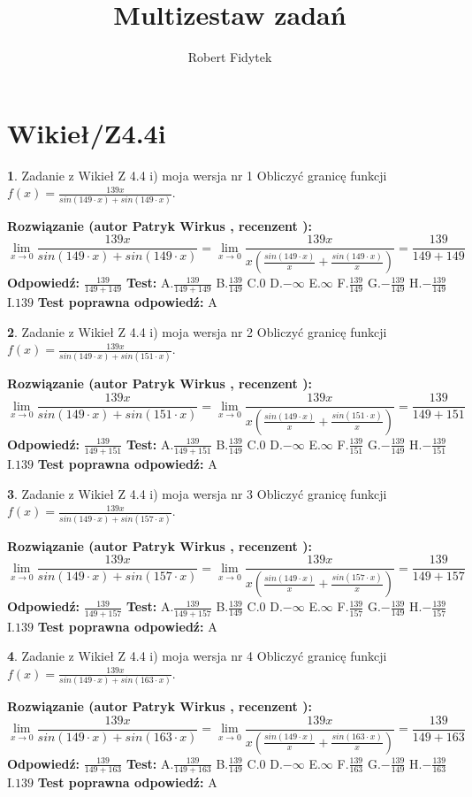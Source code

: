 \documentclass[12pt, a4paper]{article}
\title{Multizestaw zadań}
\author{Robert Fidytek}
\date{}
\theoremstyle{definition} %
\newtheorem{zad}{}
\newcommand{\kategoria}[1]{\section{#1}}
\newcommand{\zadStart}[1]{\begin{zad}#1\newline}
\newcommand{\zadStop}{\end{zad}}
\newcommand{\rozwStart}[2]{\noindent \textbf{Rozwiązanie (autor #1 , recenzent #2): }\newline}
\newcommand{\rozwStop}{\newline}
\newcommand{\odpStart}{\noindent \textbf{Odpowiedź:}\newline}
\newcommand{\odpStop}{\newline}
\newcommand{\testStart}{\noindent \textbf{Test:}\newline}
\newcommand{\testStop}{\newline}
\newcommand{\kluczStart}{\noindent \textbf{Test poprawna odpowiedź:}\newline}
\newcommand{\kluczStop}{\newline}
\begin{document}
\maketitle

\kategoria{Wikieł/Z4.4i}


\zadStart{Zadanie z Wikieł Z 4.4 i) moja wersja nr 1}
Obliczyć granicę funkcji $f(x)=\frac{139x}{sin(149\cdot x) +sin(149\cdot x)}$.
\zadStop
\rozwStart{Patryk Wirkus}{}
$$\lim\limits_{x\to 0}\frac{139x}{sin(149\cdot x) +sin(149\cdot x)}=\lim\limits_{x\to 0}\frac{139x}{x(\frac{sin(149\cdot x)}{x}+\frac{sin(149\cdot x)}{x})}=\frac{139}{149+149}$$
\rozwStop
\odpStart
$\frac{139}{149+149}$
\odpStop
\testStart
A.$\frac{139}{149+149}$
B.$\frac{139}{149}$
C.$0$
D.$-\infty$
E.$\infty$
F.$\frac{139}{149}$
G.$-\frac{139}{149}$
H.$-\frac{139}{149}$
I.$139$
\testStop
\kluczStart
A
\kluczStop



\zadStart{Zadanie z Wikieł Z 4.4 i) moja wersja nr 2}
Obliczyć granicę funkcji $f(x)=\frac{139x}{sin(149\cdot x) +sin(151\cdot x)}$.
\zadStop
\rozwStart{Patryk Wirkus}{}
$$\lim\limits_{x\to 0}\frac{139x}{sin(149\cdot x) +sin(151\cdot x)}=\lim\limits_{x\to 0}\frac{139x}{x(\frac{sin(149\cdot x)}{x}+\frac{sin(151\cdot x)}{x})}=\frac{139}{149+151}$$
\rozwStop
\odpStart
$\frac{139}{149+151}$
\odpStop
\testStart
A.$\frac{139}{149+151}$
B.$\frac{139}{149}$
C.$0$
D.$-\infty$
E.$\infty$
F.$\frac{139}{151}$
G.$-\frac{139}{149}$
H.$-\frac{139}{151}$
I.$139$
\testStop
\kluczStart
A
\kluczStop



\zadStart{Zadanie z Wikieł Z 4.4 i) moja wersja nr 3}
Obliczyć granicę funkcji $f(x)=\frac{139x}{sin(149\cdot x) +sin(157\cdot x)}$.
\zadStop
\rozwStart{Patryk Wirkus}{}
$$\lim\limits_{x\to 0}\frac{139x}{sin(149\cdot x) +sin(157\cdot x)}=\lim\limits_{x\to 0}\frac{139x}{x(\frac{sin(149\cdot x)}{x}+\frac{sin(157\cdot x)}{x})}=\frac{139}{149+157}$$
\rozwStop
\odpStart
$\frac{139}{149+157}$
\odpStop
\testStart
A.$\frac{139}{149+157}$
B.$\frac{139}{149}$
C.$0$
D.$-\infty$
E.$\infty$
F.$\frac{139}{157}$
G.$-\frac{139}{149}$
H.$-\frac{139}{157}$
I.$139$
\testStop
\kluczStart
A
\kluczStop



\zadStart{Zadanie z Wikieł Z 4.4 i) moja wersja nr 4}
Obliczyć granicę funkcji $f(x)=\frac{139x}{sin(149\cdot x) +sin(163\cdot x)}$.
\zadStop
\rozwStart{Patryk Wirkus}{}
$$\lim\limits_{x\to 0}\frac{139x}{sin(149\cdot x) +sin(163\cdot x)}=\lim\limits_{x\to 0}\frac{139x}{x(\frac{sin(149\cdot x)}{x}+\frac{sin(163\cdot x)}{x})}=\frac{139}{149+163}$$
\rozwStop
\odpStart
$\frac{139}{149+163}$
\odpStop
\testStart
A.$\frac{139}{149+163}$
B.$\frac{139}{149}$
C.$0$
D.$-\infty$
E.$\infty$
F.$\frac{139}{163}$
G.$-\frac{139}{149}$
H.$-\frac{139}{163}$
I.$139$
\testStop
\kluczStart
A
\kluczStop
\end{document}
